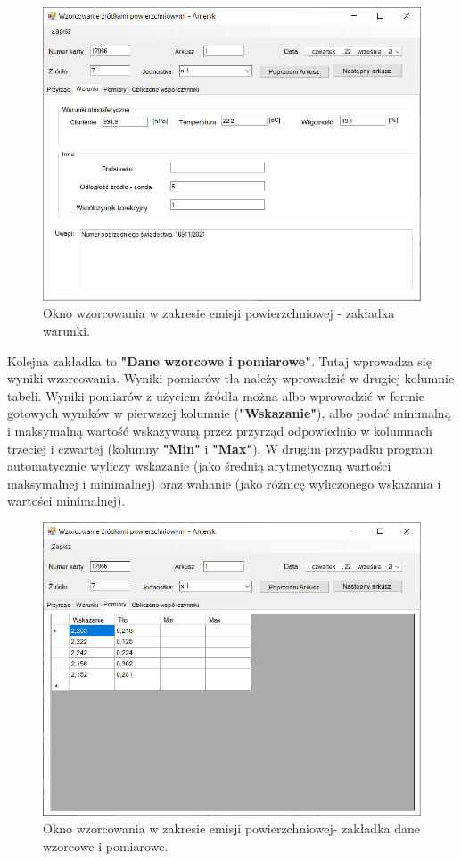 {{{	\begin{figure}[htb]
		\centering
		\includegraphics[width=\columnwidth]{obrazki/Wzorcowanie/emisja/warunki.png}
		\caption{Okno wzorcowania w zakresie emisji powierzchniowej - zakładka warunki.}
		\label{emisjaWarunki}
	\end{figure}
	
	Kolejna zakładka to \textbf{"Dane wzorcowe i pomiarowe"}. Tutaj wprowadza się wyniki wzorcowania. Wyniki pomiarów tła należy wprowadzić w drugiej kolumnie tabeli. Wyniki pomiarów z użyciem źródła można albo wprowadzić w formie gotowych wyników w pierwszej kolumnie (\textbf{"Wskazanie"}), albo podać minimalną i maksymalną wartość wskazywaną przez przyrząd odpowiednio w kolumnach trzeciej i czwartej (kolumny \textbf{"Min"} i \textbf{"Max"}). W drugim przypadku program automatycznie wyliczy wskazanie (jako średnią arytmetyczną wartości maksymalnej i minimalnej) oraz wahanie (jako różnicę wyliczonego wskazania i wartości minimalnej).
	
	\begin{figure}[htb]
		\centering
		\includegraphics[width=\columnwidth]{obrazki/Wzorcowanie/emisja/dane.png}
		\caption{Okno wzorcowania w zakresie emisji powierzchniowej- zakładka dane wzorcowe i pomiarowe.}
		\label{emisjaDane}
	\end{figure}
	
}}}
